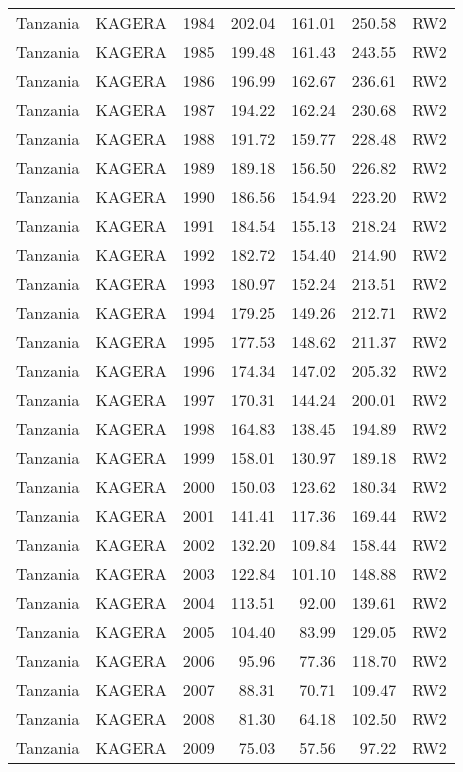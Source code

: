\begin{longtable}{lllrrrl}
  Tanzania & KAGERA & 1984 & 202.04 & 161.01 & 250.58 & RW2 \\ 
  Tanzania & KAGERA & 1985 & 199.48 & 161.43 & 243.55 & RW2 \\ 
  Tanzania & KAGERA & 1986 & 196.99 & 162.67 & 236.61 & RW2 \\ 
  Tanzania & KAGERA & 1987 & 194.22 & 162.24 & 230.68 & RW2 \\ 
  Tanzania & KAGERA & 1988 & 191.72 & 159.77 & 228.48 & RW2 \\ 
  Tanzania & KAGERA & 1989 & 189.18 & 156.50 & 226.82 & RW2 \\ 
  Tanzania & KAGERA & 1990 & 186.56 & 154.94 & 223.20 & RW2 \\ 
  Tanzania & KAGERA & 1991 & 184.54 & 155.13 & 218.24 & RW2 \\ 
  Tanzania & KAGERA & 1992 & 182.72 & 154.40 & 214.90 & RW2 \\ 
  Tanzania & KAGERA & 1993 & 180.97 & 152.24 & 213.51 & RW2 \\ 
  Tanzania & KAGERA & 1994 & 179.25 & 149.26 & 212.71 & RW2 \\ 
  Tanzania & KAGERA & 1995 & 177.53 & 148.62 & 211.37 & RW2 \\ 
  Tanzania & KAGERA & 1996 & 174.34 & 147.02 & 205.32 & RW2 \\ 
  Tanzania & KAGERA & 1997 & 170.31 & 144.24 & 200.01 & RW2 \\ 
  Tanzania & KAGERA & 1998 & 164.83 & 138.45 & 194.89 & RW2 \\ 
  Tanzania & KAGERA & 1999 & 158.01 & 130.97 & 189.18 & RW2 \\ 
  Tanzania & KAGERA & 2000 & 150.03 & 123.62 & 180.34 & RW2 \\ 
  Tanzania & KAGERA & 2001 & 141.41 & 117.36 & 169.44 & RW2 \\ 
  Tanzania & KAGERA & 2002 & 132.20 & 109.84 & 158.44 & RW2 \\ 
  Tanzania & KAGERA & 2003 & 122.84 & 101.10 & 148.88 & RW2 \\ 
  Tanzania & KAGERA & 2004 & 113.51 & 92.00 & 139.61 & RW2 \\ 
  Tanzania & KAGERA & 2005 & 104.40 & 83.99 & 129.05 & RW2 \\ 
  Tanzania & KAGERA & 2006 & 95.96 & 77.36 & 118.70 & RW2 \\ 
  Tanzania & KAGERA & 2007 & 88.31 & 70.71 & 109.47 & RW2 \\ 
  Tanzania & KAGERA & 2008 & 81.30 & 64.18 & 102.50 & RW2 \\ 
  Tanzania & KAGERA & 2009 & 75.03 & 57.56 & 97.22 & RW2 \\ 

\end{longtable}

